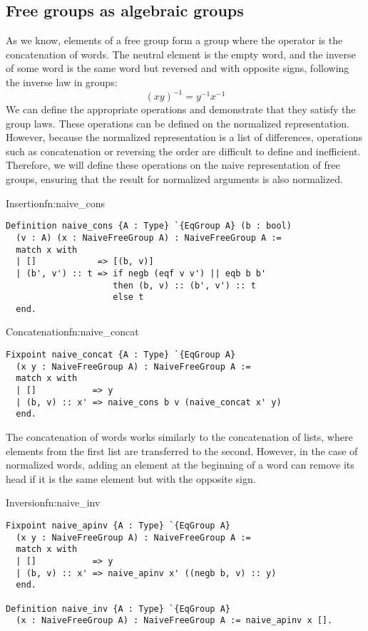 \subsection{Free groups as algebraic groups}
As we know, elements of a free group form a group where the operator is the concatenation of words. The neutral element is the empty word, and the inverse of some word is the same word but reversed and with opposite signs, following the inverse law in groups:
$$
(xy)^{-1} = y^{-1}x^{-1}
$$
We can define the appropriate operations and demonstrate that they satisfy the group laws. These operations can be defined on the normalized representation. However, because the normalized representation is a list of differences, operations such as concatenation or reversing the order are difficult to define and inefficient. Therefore, we will define these operations on the naive representation of free groups, ensuring that the result for normalized arguments is also normalized.
\begin{func}{Insertion}{fn:naive_cons}
\begin{verbatim}
Definition naive_cons {A : Type} `{EqGroup A} (b : bool) 
  (v : A) (x : NaiveFreeGroup A) : NaiveFreeGroup A :=
  match x with
  | []            => [(b, v)]
  | (b', v') :: t => if negb (eqf v v') || eqb b b'
                     then (b, v) :: (b', v') :: t
                     else t
  end.
\end{verbatim}
\end{func}
\begin{func}{Concatenation}{fn:naive_concat}
\begin{verbatim}
Fixpoint naive_concat {A : Type} `{EqGroup A} 
  (x y : NaiveFreeGroup A) : NaiveFreeGroup A :=
  match x with
  | []           => y
  | (b, v) :: x' => naive_cons b v (naive_concat x' y)
  end.
\end{verbatim}
\end{func}
The concatenation of words  works similarly to the concatenation of lists, where elements from the first list are transferred to the second. However, in the case of normalized words, adding an element at the beginning of a word can remove its head if it is the same element but with the opposite sign.
\begin{func}{Inversion}{fn:naive_inv}
\begin{verbatim}
Fixpoint naive_apinv {A : Type} `{EqGroup A} 
  (x y : NaiveFreeGroup A) : NaiveFreeGroup A :=
  match x with
  | []           => y
  | (b, v) :: x' => naive_apinv x' ((negb b, v) :: y)
  end.

Definition naive_inv {A : Type} `{EqGroup A} 
  (x : NaiveFreeGroup A) : NaiveFreeGroup A := naive_apinv x [].
\end{verbatim}
\end{func}
